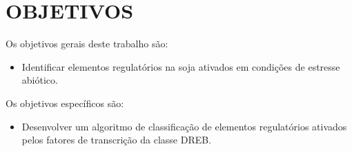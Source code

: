 \chapter{OBJETIVOS}

Os objetivos gerais deste trabalho são:

\begin{itemize}

\item Identificar elementos regulatórios na soja ativados em condições de estresse abiótico.

\end{itemize}

Os objetivos específicos são:

\begin{itemize}

\item Desenvolver um algoritmo de classificação de elementos regulatórios ativados pelos fatores de transcrição da classe DREB.

\end{itemize}
